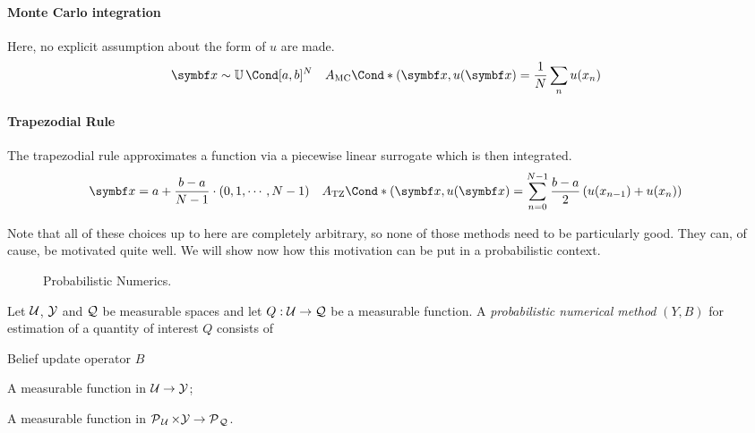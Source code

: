 \paragraph{Monte Carlo integration}
Here, no explicit assumption about the form of $u$ are made.
\begin{align}
    \mat{x}
        &\sim \Uniform{[a, b]^N}
        &\Fun*{A_{\text{MC}}}{(\mat{x}, u(\mat{x})}
        &= \frac{1}{N} \sum_n u(x_n)
\end{align}

\paragraph{Trapezodial Rule}
The trapezodial rule approximates a function via a piecewise linear surrogate which is then integrated.
\begin{align}
    \mat{x}
    &= a + \frac{b - a}{N - 1} \cdot (0, 1, \cdots, N - 1)
    &\Fun*{A_{\text{TZ}}}{(\mat{x}, u(\mat{x})}
    &= \sum_{n=0}^{N - 1} \frac{b - a}{2} \left( u(x_{n-1}) + u(x_n) \right)
\end{align}

Note that all of these choices up to here are completely arbitrary, so none of those methods need to be particularly good.
They can, of cause, be motivated quite well.
We will show now how this motivation can be put in a probabilistic context.


\begin{figure}[t]
    \centering
    
    \caption[Probabilistic Numerics]{
        Probabilistic Numerics.
        \label{fig:probabilistic_numerics:probabilistic_numerics}
    }
\end{figure}
\begin{definition}
    \label{def:probabilistic_numerics:probabilistic_numerical_method}
    Let $\mathcal{U}$, $\mathcal{Y}$ and $\mathcal{Q}$ be measurable spaces and let $Q: \mathcal{U} \to \mathcal{Q}$ be a measurable function.
    A \emph{probabilistic numerical method} $(Y, B)$ for estimation of a quantity of interest $Q$ consists of
    \begin{labeling}{Belief update operator $B$\quad}
        \item[Information operator $Y$] A measurable function in $\mathcal{U} \to \mathcal{Y}$;
        \item[Belief update operator $B$] A measurable function in $\operatorname{\mathcal{P}\mkern1mu}_{\mathcal{U}} \times \mathcal{Y} \to \operatorname{\mathcal{P}\mkern1mu}_{\mathcal{Q}}$.
    \end{labeling}
\end{definition}

